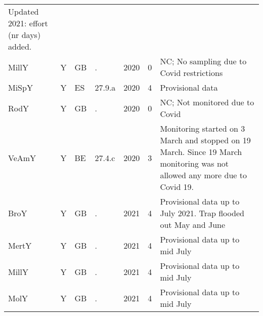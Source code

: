 \begin{table}[htbp]
\begin{tabular}{p{1.5cm}p{1.5cm}p{1.5cm}p{1cm}p{1cm}p{1cm}p{8cm}}
 Updated 2021: effort (nr days) added. \\ 
  MillY & Y & GB & . & 2020 &   0 & NC; No sampling due to Covid restrictions \\ 
  MiSpY & Y & ES & 27.9.a & 2020 &   4 & Provisional data \\ 
  RodY & Y & GB & . & 2020 &   0 & NC; Not monitored due to Covid \\ 
  VeAmY & Y & BE & 27.4.c & 2020 &   3 & Monitoring started on 3 March and stopped on 19 March. Since 19 March monitoring was not allowed any more due to Covid 19. \\ 
  BroY & Y & GB & . & 2021 &   4 & Provisional data up to July 2021. Trap flooded out May and June \\ 
  MertY & Y & GB & . & 2021 &   4 & Provisional data up to mid July \\ 
  MillY & Y & GB & . & 2021 &   4 & Provisional data up to mid July \\ 
  MolY & Y & GB & . & 2021 &   4 & Provisional data up to mid July \\ 
   \hline
\end{tabular}
\end{table}
